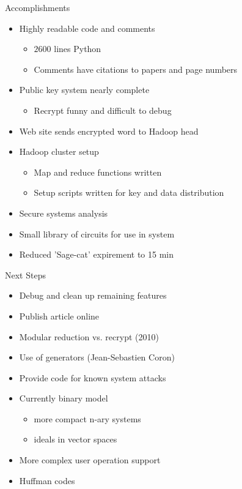 \documentclass[dvips,11pt]{beamer}
\begin{document}
\begin{frame}{ Accomplishments }
  \begin{itemize}
  \item Highly readable code and comments
    \begin{itemize}
      \item \(2600\) lines Python
      \item Comments have citations to papers and page numbers
    \end{itemize}
  \item Public key system nearly complete
    \begin{itemize}
    \item Recrypt funny and difficult to debug
    \end{itemize}
  \item Web site sends encrypted word to Hadoop head 
  \item Hadoop cluster setup 
    \begin{itemize} 
    \item Map and reduce functions written
    \item Setup scripts written for key and data distribution
    \end{itemize}
  \item Secure systems analysis
  \item Small library of circuits for use in system
  \item Reduced 'Sage-cat' expirement to 15 min
  \end{itemize}
\end{frame}


\begin{frame}{Next Steps}
  \begin{itemize}
    \item Debug and clean up remaining features
    \item Publish article online
  \end{itemize}
  \hrulefill
  \begin{itemize}
    \item Modular reduction vs. recrypt (2010)
    \item Use of generators (Jean-Sebastien Coron)
    \item Provide code for known system attacks
    \item Currently binary model
      \begin{itemize}
      \item more compact n-ary systems
      \item ideals in vector spaces
      \end{itemize}
  \end{itemize}
  \hrulefill
  \begin{itemize}
  \item More complex user operation support
  \item Huffman codes
  \end{itemize}
\end{frame}
\end{document}
